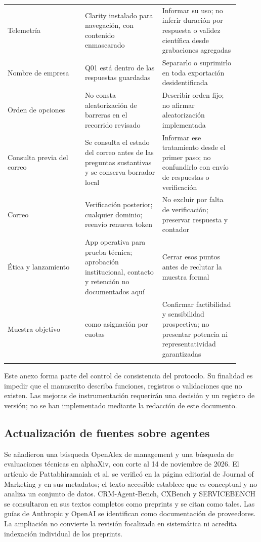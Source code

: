 \documentclass[12pt,letterpaper]{article}
\begin{document}
\begin{longtable}{>{\raggedright\arraybackslash}p{0.303\linewidth}>{\raggedright\arraybackslash}p{0.303\linewidth}>{\raggedright\arraybackslash}p{0.303\linewidth}}
Telemetría & Clarity instalado para navegación, con contenido enmascarado & Informar su uso; no inferir duración por respuesta o validez científica desde grabaciones agregadas \\ \addlinespace[5pt]
Nombre de empresa & Q01 está dentro de las respuestas guardadas & Separarlo o suprimirlo en toda exportación desidentificada \\ \addlinespace[5pt]
Orden de opciones & No consta aleatorización de barreras en el recorrido revisado & Describir orden fijo; no afirmar aleatorización implementada \\ \addlinespace[5pt]
Consulta previa del correo & Se consulta el estado del correo antes de las preguntas sustantivas y se conserva borrador local & Informar ese tratamiento desde el primer paso; no confundirlo con envío de respuestas o verificación \\ \addlinespace[5pt]
Correo & Verificación posterior; cualquier dominio; reenvío renueva token & No excluir por falta de verificación; preservar respuesta y contador \\ \addlinespace[5pt]
Ética y lanzamiento & App operativa para prueba técnica; aprobación institucional, contacto y retención no documentados aquí & Cerrar esos puntos antes de reclutar la muestra formal \\ \addlinespace[5pt]
Muestra objetivo & 2.800 como asignación por cuotas & Confirmar factibilidad y sensibilidad prospectiva; no presentar potencia ni representatividad garantizadas \\ \addlinespace[5pt]
\bottomrule\end{longtable}\endgroup
Este anexo forma parte del control de consistencia del protocolo. Su finalidad es impedir que el manuscrito describa funciones, registros o validaciones que no existen. Las mejoras de instrumentación requerirán una decisión y un registro de versión; no se han implementado mediante la redacción de este documento.

\subsection*{Actualización de fuentes sobre agentes}
Se añadieron una búsqueda OpenAlex de management y una búsqueda de evaluaciones técnicas en alphaXiv, con corte al 14 de noviembre de 2026. El artículo de Pattabhiramaiah et al. se verificó en la página editorial de Journal of Marketing y en sus metadatos; el texto accesible establece que es conceptual y no analiza un conjunto de datos. CRM-Agent-Bench, CXBench y SERVICEBENCH se consultaron en sus textos completos como preprints y se citan como tales. Las guías de Anthropic y OpenAI se identifican como documentación de proveedores. La ampliación no convierte la revisión focalizada en sistemática ni acredita indexación individual de los preprints.
\end{document}
